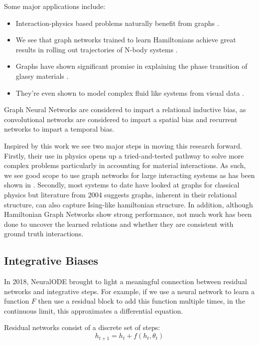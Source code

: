 \documentclass{article}
\begin{document}
Some major applications include:
\begin{itemize}
\item Interaction-physics based problems naturally benefit from graphs \cite{battaglia_relational_2018}. 
\item We see that graph networks trained to learn Hamiltonians achieve great results in rolling out trajectories of N-body systems \cite{sanchez-gonzalez_hamiltonian_2019}. 
\item Graphs have shown significant promise in explaining the phase transition of glassy materials \cite{bapst_unveiling_2020}. 
\item They're even shown to model complex fluid like systems from visual data \cite{sanchez-gonzalez_learning_2020}. 
\end{itemize}

Graph Neural Networks are considered to impart a relational inductive bias, as convolutional networks are considered to impart a spatial bias and recurrent networks to impart a temporal bias. 

Inspired by this work we see two major steps in moving this research forward. Firstly, their use in physics opens up a tried-and-tested pathway to solve more complex problems particularly in accounting for material interactions. As such, we see good scope to use graph networks for large interacting systems as has been shown in \cite{sanchez-gonzalez_learning_2020}. Secondly, most systems to date have looked at graphs for classical physics but literature from 2004 suggests graphs, inherent in their relational structure, can also capture Ising-like hamiltonian structure. In addition, although Hamiltonian Graph Networks show strong performance, not much work has been done to uncover the learned relations and whether they are consistent with ground truth interactions.


\subsection{Integrative Biases}

In 2018, NeuralODE brought to light a meaningful connection between residual networks and integrative steps. For example, if we use a neural network to learn a function $F$ then use a residual block to add this function multiple times, in the continuous limit, this approximates a differential equation.

Residual networks consist of a discrete set of steps:
$$ h_{t+1} = h_t + f(h_t,\theta_t) $$
\end{document}
